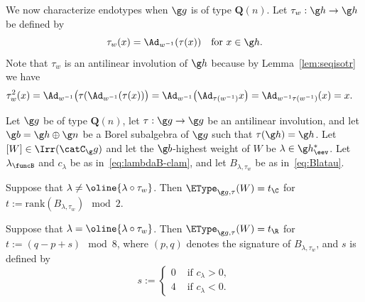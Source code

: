 \documentclass[12pt]{amsart}
\begin{document}
We now characterize endotypes when $\g g$ is of type $\mathbf Q(n)$. 
Let $\tau_w:\g h\to\g h$ be defined by 
\[
\tau_w(x)=\Ad_{w^{-1}}(\tau(x))\quad\text{for }x\in\g h.
\] 
Note that $\tau_w$ is an antilinear involution of $\g h$ because by Lemma~\ref{lem:seqisotr}  we have
\begin{align*}
\tau_w^2(x)
=\Ad_{w^{-1}}\big(\tau(\Ad_{w^{-1}}(\tau(x))\big)
&=
\Ad_{w^{-1}}
\big(
\Ad_{\tau(w^{-1})}x
\big)
=\Ad_{w^{-1}\tau(w^{-1})}(x)=x
.\end{align*}


\begin{thm}
\label{thm-endotypes-Q(n)}
Let $\g g$ be of type $\mathbf Q(n)$,
let $\tau:\g g\to\g g$ be an antilinear involution, and let $\g b=\g h\oplus \g n$ be a Borel subalgebra of $\g g$ such that $\tau(\g h)=\g h$. Let $[W]\in\Irr(\catC_\g g)$  and let the  $\g b$-highest weight of $W$ be $\lambda\in\g h_\eev^*$.
Let $\lambda_\funcB$ and $c_\lambda$ be as in~\eqref{eq:lambdaB-clam}, and 
let $B_{\lambda,\tau_w}$ be  as in~\eqref{eq:Blatau}. 

\item[\rm (i)] Suppose that $\lambda\neq \oline{\lambda\circ\tau_w}$. Then $\EType_{\g g,\tau}(W)=t_\C$ for $t:=\mathrm{rank}(B_{\lambda,\tau_w})\mod 2$. 

\item[\rm (ii)] Suppose that $\lambda= \oline{\lambda\circ\tau_w}$. Then 
$\EType_{\g g,\tau}(W)=t_\R$ for $t:=(q-p+s)\mod 8$, where $(p,q)$ denotes the signature of $B_{\lambda,\tau_w}$, and $s$ is defined by
\[
s:=\begin{cases}
0 & \text{ if }c_\lambda>0,\\
4 & \text{ if }c_\lambda<0.
\end{cases}
\] 
\end{thm}
\end{document}
